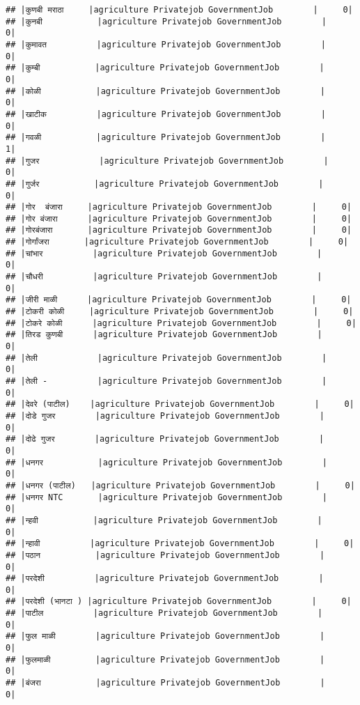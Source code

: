 \documentclass[
]{article}
\begin{document}
\begin{verbatim}
## |कुणबी मराठा     |agriculture Privatejob GovernmentJob        |     0|
## |कुनबी           |agriculture Privatejob GovernmentJob        |     0|
## |कुमावत          |agriculture Privatejob GovernmentJob        |     0|
## |कुम्बी           |agriculture Privatejob GovernmentJob        |     0|
## |कोळी           |agriculture Privatejob GovernmentJob        |     0|
## |खाटीक          |agriculture Privatejob GovernmentJob        |     0|
## |गवळी           |agriculture Privatejob GovernmentJob        |     1|
## |गुजर            |agriculture Privatejob GovernmentJob        |     0|
## |गुर्जर           |agriculture Privatejob GovernmentJob        |     0|
## |गोर  बंजारा     |agriculture Privatejob GovernmentJob        |     0|
## |गोर बंजारा      |agriculture Privatejob GovernmentJob        |     0|
## |गोरबंजारा       |agriculture Privatejob GovernmentJob        |     0|
## |गोर्गांजरा       |agriculture Privatejob GovernmentJob        |     0|
## |चांभार          |agriculture Privatejob GovernmentJob        |     0|
## |चौधरी          |agriculture Privatejob GovernmentJob        |     0|
## |जीरी माळी      |agriculture Privatejob GovernmentJob        |     0|
## |टोकरी कोळी     |agriculture Privatejob GovernmentJob        |     0|
## |टोकरे कोळी      |agriculture Privatejob GovernmentJob        |     0|
## |तिरड कुणबी      |agriculture Privatejob GovernmentJob        |     0|
## |तेली            |agriculture Privatejob GovernmentJob        |     0|
## |तेली -          |agriculture Privatejob GovernmentJob        |     0|
## |देवरे (पाटील)    |agriculture Privatejob GovernmentJob        |     0|
## |दोडे गुजर        |agriculture Privatejob GovernmentJob        |     0|
## |दोढे गुजर        |agriculture Privatejob GovernmentJob        |     0|
## |धनगर           |agriculture Privatejob GovernmentJob        |     0|
## |धनगर (पाटील)   |agriculture Privatejob GovernmentJob        |     0|
## |धनगर NTC       |agriculture Privatejob GovernmentJob        |     0|
## |न्हवी           |agriculture Privatejob GovernmentJob        |     0|
## |न्हावी          |agriculture Privatejob GovernmentJob        |     0|
## |पठान           |agriculture Privatejob GovernmentJob        |     0|
## |परदेशी          |agriculture Privatejob GovernmentJob        |     0|
## |परदेशी (भानटा ) |agriculture Privatejob GovernmentJob        |     0|
## |पाटील          |agriculture Privatejob GovernmentJob        |     0|
## |फुल माळी        |agriculture Privatejob GovernmentJob        |     0|
## |फुलमाळी         |agriculture Privatejob GovernmentJob        |     0|
## |बंजरा           |agriculture Privatejob GovernmentJob        |     0|

\end{verbatim}
\end{document}
